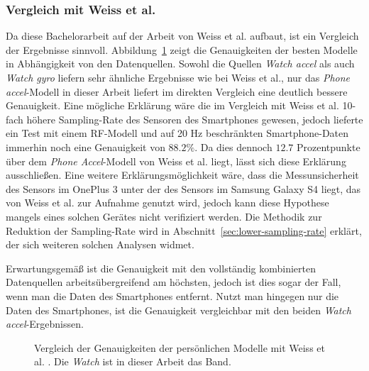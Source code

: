 \subsubsection{Vergleich mit Weiss et al.}
Da diese Bachelorarbeit auf der Arbeit von Weiss et al. \cite{Weiss2016} aufbaut, ist ein Vergleich der Ergebnisse sinnvoll. Abbildung~\ref{fig:accuracy-personal-vs-weiss} zeigt die Genauigkeiten der besten Modelle in Abhängigkeit von den Datenquellen. Sowohl die Quellen \textit{Watch accel} als auch \textit{Watch gyro} liefern sehr ähnliche Ergebnisse wie bei Weiss et al., nur das \textit{Phone accel}-Modell in dieser Arbeit liefert im direkten Vergleich eine deutlich bessere Genauigkeit. Eine mögliche Erklärung wäre die im Vergleich mit Weiss et al. 10-fach höhere Sampling-Rate des Sensoren des Smartphones gewesen, jedoch lieferte ein Test mit einem RF-Modell und auf 20 Hz beschränkten Smartphone-Daten immerhin noch eine Genauigkeit von $88.2 \%$. Da dies dennoch $12.7$ Prozentpunkte über dem \textit{Phone Accel}-Modell von Weiss et al. liegt, lässt sich diese Erklärung ausschließen. Eine weitere Erklärungsmöglichkeit wäre, dass die Messunsicherheit des Sensors im OnePlus 3 unter der des Sensors im Samsung Galaxy S4 liegt, das von Weiss et al. zur Aufnahme genutzt wird, jedoch kann diese Hypothese mangels eines solchen Gerätes nicht verifiziert werden. Die Methodik zur Reduktion der Sampling-Rate wird in Abschnitt~\ref{sec:lower-sampling-rate} erklärt, der sich weiteren solchen Analysen widmet.

Erwartungsgemäß ist die Genauigkeit mit den vollständig kombinierten Datenquellen arbeitsübergreifend am höchsten, jedoch ist dies sogar der Fall, wenn man die Daten des Smartphones entfernt. Nutzt man hingegen nur die Daten des Smartphones, ist die Genauigkeit vergleichbar mit den beiden \textit{Watch accel}-Ergebnissen.

\begin{figure}
\centering
{}
\caption[Vergleich der Genauigkeiten der persönlichen Modelle mit Weiss et al. \cite{Weiss2016}]{Vergleich der Genauigkeiten der persönlichen Modelle mit Weiss et al. \cite{Weiss2016}. Die \textit{Watch} ist in dieser Arbeit das Band.}
\label{fig:accuracy-personal-vs-weiss}
\end{figure}

